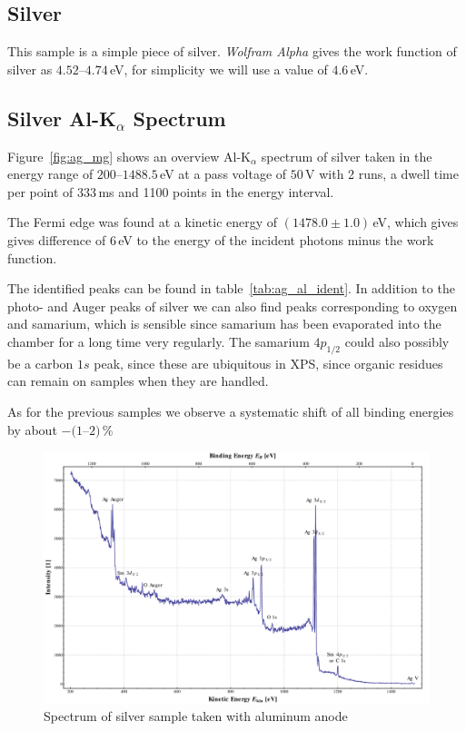 \documentclass[a4paper,10pt]{scrartcl}
\begin{document}
\subsection{Silver}

This sample is a simple piece of silver. \textit{Wolfram Alpha} gives the work function of silver as $4.52$--$4.74\,$eV, for simplicity we will use a value of $4.6\,$eV.

\subsection*{Silver Al-K$_{\alpha}$ Spectrum}

Figure~\ref{fig:ag_mg} shows an overview Al-K$_{\alpha}$ spectrum of silver taken in the energy range of $200$--$1488.5\,$eV at a pass voltage of $50\,$V with 2 runs, a dwell time per point of $333\,$ms and 1100 points in the energy interval. 

The Fermi edge  was found at a kinetic energy of $(1478.0 \pm 1.0)\,$eV, which gives gives difference of $6\,$eV to the energy of the incident photons minus the work function.

The identified peaks can be found in table~\ref{tab:ag_al_ident}. In addition to the photo- and Auger peaks of silver we can also find  peaks corresponding to oxygen and samarium, which is sensible since samarium has been evaporated into the chamber for a long time very regularly. The samarium $4p_{1/2}$ could also possibly be a carbon $1s$ peak, since these are ubiquitous in XPS, since organic residues can remain on samples when they are handled.

As for the previous samples we observe a systematic shift of all binding energies by about $-(1$--$2)\,\%$

\begin{figure}[h]
\centering
\includegraphics[scale=0.3]{img/silver_binding_al}
\caption{Spectrum of silver sample taken with aluminum anode \label{fig:ag_al}}
\end{figure}
\end{document}
